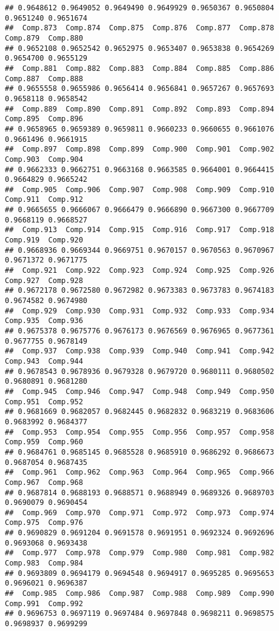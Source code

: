 \documentclass[
]{article}
\begin{document}
\begin{verbatim}
## 0.9648612 0.9649052 0.9649490 0.9649929 0.9650367 0.9650804 0.9651240 0.9651674 
##  Comp.873  Comp.874  Comp.875  Comp.876  Comp.877  Comp.878  Comp.879  Comp.880 
## 0.9652108 0.9652542 0.9652975 0.9653407 0.9653838 0.9654269 0.9654700 0.9655129 
##  Comp.881  Comp.882  Comp.883  Comp.884  Comp.885  Comp.886  Comp.887  Comp.888 
## 0.9655558 0.9655986 0.9656414 0.9656841 0.9657267 0.9657693 0.9658118 0.9658542 
##  Comp.889  Comp.890  Comp.891  Comp.892  Comp.893  Comp.894  Comp.895  Comp.896 
## 0.9658965 0.9659389 0.9659811 0.9660233 0.9660655 0.9661076 0.9661496 0.9661915 
##  Comp.897  Comp.898  Comp.899  Comp.900  Comp.901  Comp.902  Comp.903  Comp.904 
## 0.9662333 0.9662751 0.9663168 0.9663585 0.9664001 0.9664415 0.9664829 0.9665242 
##  Comp.905  Comp.906  Comp.907  Comp.908  Comp.909  Comp.910  Comp.911  Comp.912 
## 0.9665655 0.9666067 0.9666479 0.9666890 0.9667300 0.9667709 0.9668119 0.9668527 
##  Comp.913  Comp.914  Comp.915  Comp.916  Comp.917  Comp.918  Comp.919  Comp.920 
## 0.9668936 0.9669344 0.9669751 0.9670157 0.9670563 0.9670967 0.9671372 0.9671775 
##  Comp.921  Comp.922  Comp.923  Comp.924  Comp.925  Comp.926  Comp.927  Comp.928 
## 0.9672178 0.9672580 0.9672982 0.9673383 0.9673783 0.9674183 0.9674582 0.9674980 
##  Comp.929  Comp.930  Comp.931  Comp.932  Comp.933  Comp.934  Comp.935  Comp.936 
## 0.9675378 0.9675776 0.9676173 0.9676569 0.9676965 0.9677361 0.9677755 0.9678149 
##  Comp.937  Comp.938  Comp.939  Comp.940  Comp.941  Comp.942  Comp.943  Comp.944 
## 0.9678543 0.9678936 0.9679328 0.9679720 0.9680111 0.9680502 0.9680891 0.9681280 
##  Comp.945  Comp.946  Comp.947  Comp.948  Comp.949  Comp.950  Comp.951  Comp.952 
## 0.9681669 0.9682057 0.9682445 0.9682832 0.9683219 0.9683606 0.9683992 0.9684377 
##  Comp.953  Comp.954  Comp.955  Comp.956  Comp.957  Comp.958  Comp.959  Comp.960 
## 0.9684761 0.9685145 0.9685528 0.9685910 0.9686292 0.9686673 0.9687054 0.9687435 
##  Comp.961  Comp.962  Comp.963  Comp.964  Comp.965  Comp.966  Comp.967  Comp.968 
## 0.9687814 0.9688193 0.9688571 0.9688949 0.9689326 0.9689703 0.9690079 0.9690454 
##  Comp.969  Comp.970  Comp.971  Comp.972  Comp.973  Comp.974  Comp.975  Comp.976 
## 0.9690829 0.9691204 0.9691578 0.9691951 0.9692324 0.9692696 0.9693068 0.9693438 
##  Comp.977  Comp.978  Comp.979  Comp.980  Comp.981  Comp.982  Comp.983  Comp.984 
## 0.9693809 0.9694179 0.9694548 0.9694917 0.9695285 0.9695653 0.9696021 0.9696387 
##  Comp.985  Comp.986  Comp.987  Comp.988  Comp.989  Comp.990  Comp.991  Comp.992 
## 0.9696753 0.9697119 0.9697484 0.9697848 0.9698211 0.9698575 0.9698937 0.9699299 

\end{verbatim}
\end{document}
